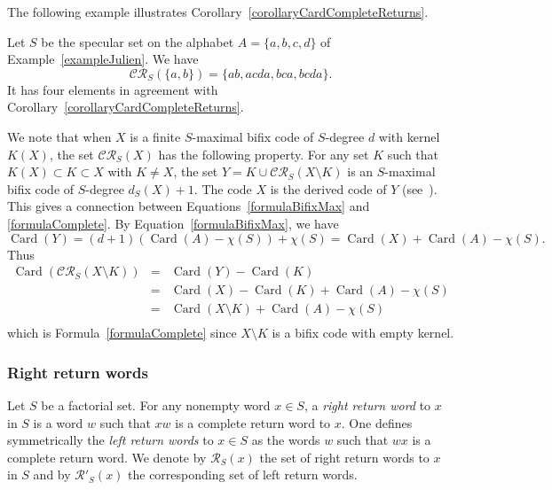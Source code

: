\documentclass[preprint,12pt]{elsarticle}
\newcommand\RR{\mathcal{R}}
\newcommand\CR{\mathcal{CR}}
\DeclareMathOperator{\Card}{Card}
\numberwithin{theorem}{section}
\numberwithin{equation}{section}
\numberwithin{figure}{section}
\numberwithin{table}{section}
\begin{document}
The following example illustrates Corollary~\ref{corollaryCardCompleteReturns}.

\begin{example}
\label{exampleJulien3}
Let $S$ be the specular set on the alphabet $A=\{a,b,c,d\}$
of Example~\ref{exampleJulien}. 
We have
\begin{displaymath}
\CR_S(\{a,b\})=\{ab,acda,bca,bcda\}.
\end{displaymath}
It has four elements in agreement with Corollary~\ref{corollaryCardCompleteReturns}.
\end{example}

We note that when $X$ is a finite $S$-maximal bifix code
of $S$-degree $d$
with kernel $K(X)$, the
set $\CR_S(X)$ has the following property.
 For any set $K$ such that $K(X)\subset K\subset X$
with $K\ne X$, the set
$Y=K\cup \CR_S(X\setminus K)$
is an $S$-maximal bifix code of $S$-degree $d_S(X)+1$.
The code $X$ is the derived code of $Y$
(see~\cite[Section 4.3]{BerstelDeFelicePerrinReutenauerRindone2012}).
This gives a connection between Equations~\eqref{formulaBifixMax}
and \eqref{formulaComplete}. 
By Equation~\eqref{formulaBifixMax}, we have
\begin{displaymath}
\Card(Y)=(d+1)(\Card(A)-\chi(S))+\chi(S)=\Card(X)+\Card(A)-\chi(S).
\end{displaymath}
Thus 
\begin{eqnarray*}
\Card(\CR_S(X\setminus K))&=&\Card(Y)-\Card(K)\\
&=&\Card(X)-\Card(K)+\Card(A)-\chi(S)\\
&=&\Card(X\setminus K)+\Card(A)-\chi(S)\\
\end{eqnarray*}
which is Formula~\eqref{formulaComplete} since $X\setminus K$
is a bifix code with empty kernel.





\subsubsection{Right  return words}

Let $S$ be a factorial set. For any nonempty word 
$x\in S$, a \emph{right return
word} to $x$ in $S$ is a word $w$ such that $xw$ is a  complete return
word to $x$. One defines symmetrically the \emph{left  return words}
to $x\in S$
as the words $w$ such that $wx$ is a  complete return word.
We denote by $\RR_S(x)$ the set of right  return
words to $x$ in $S$ and by $\RR'_S(x)$ the corresponding set
of left  return words. 
\end{document}
